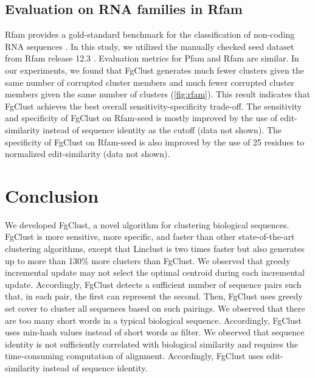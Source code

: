 \documentclass[11pt,letterpaper]{llncs2e/llncs}
\begin{document}
\subsection{Evaluation on RNA families in Rfam}

Rfam provides a gold-standard benchmark for the classification of non-coding RNA sequences \citep{nawrocki2014rfam}.
In this study, we utilized the manually checked seed dataset from Rfam release 12.3 \citep{nawrocki2014rfam}.
Evaluation metrics for Pfam and Rfam are similar.
In our experiments, we found that FgClust generates much fewer clusters given the same number of corrupted cluster members and much fewer corrupted cluster members given the same number of clusters (\cref{fig:rfam}).
This result indicates that FgClust achieves the best overall sensitivity-specificity trade-off.
The sensitivity and specificity of FgClust on Rfam-seed is mostly improved by the use of edit-similarity instead of sequence identity as the cutoff (data not shown).
The specificity of FgClust on Rfam-seed is also improved by the use of 25 residues to normalized edit-similarity (data not shown).

\section{Conclusion}

We developed FgClust, a novel algorithm for clustering biological sequences.
FgClust is more sensitive, more specific, and faster than other state-of-the-art clustering algorithms, except that Linclust is two times faster but also generates up to more than 130\% more clusters than FgClust.
We observed that greedy incremental update may not select the optimal centroid during each incremental update.
Accordingly, FgClust detects a sufficient number of sequence pairs such that, in each pair, the first can represent the second.
Then, FgClust uses greedy set cover to cluster all sequences based on such pairings.
We observed that there are too many short words in a typical biological sequence.
Accordingly, FgClust uses min-hash values instead of short words as filter.
We observed that sequence identity is not sufficiently correlated with biological similarity and requires the time-consuming computation of alignment.
Accordingly, FgClust uses edit-similarity instead of sequence identity.
\end{document}
